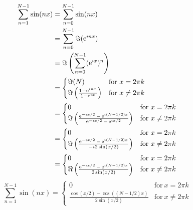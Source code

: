 {%
\begin{Solution}
  \label{solution sum sin nx}
  \begin{align*}
    \sum_{n=1}^{N-1} \sin(n x)
    &= \sum_{n=0}^{N-1} \sin(n x) 
    \\
    &= \sum_{n=0}^{N-1} \Im(\mathop{\mathrm{e}}\nolimits^{\imath n x}) 
    \\
    &= \Im \left( \sum_{n=0}^{N-1} (\mathop{\mathrm{e}}\nolimits^{\imath x})^n \right) 
    \\
    &= \begin{cases}
      \Im(N) &\mathrm{for}\ x = 2 \pi k 
      \\
      \Im \left( \frac{1 - \mathop{\mathrm{e}}\nolimits^{\imath n x}}{1-\mathop{\mathrm{e}}\nolimits^{\imath x}} \right) 
      &\mathrm{for}\ x \neq 2 \pi k
    \end{cases} 
    \\
    &= \begin{cases}
      0 &\mathrm{for}\ x = 2 \pi k 
      \\
      \Im \left( \frac{\mathop{\mathrm{e}}\nolimits^{-\imath x/2} - \mathop{\mathrm{e}}\nolimits^{\imath (N-1/2) x}}{\mathop{\mathrm{e}}\nolimits^{-\imath x/2} - \mathop{\mathrm{e}}\nolimits^{\imath x/2}} \right) 
      &\mathrm{for}\ x \neq 2 \pi k
    \end{cases} 
    \\
    &= \begin{cases}
      0 &\mathrm{for}\ x = 2 \pi k 
      \\
      \Im \left( \frac{\mathop{\mathrm{e}}\nolimits^{-\imath x/2} - \mathop{\mathrm{e}}\nolimits^{\imath (N-1/2) x}}{ - \imath 2 \sin(x/2) } \right) 
      &\mathrm{for}\ x \neq 2 \pi k
    \end{cases} 
    \\
    &= \begin{cases}
      0 &\mathrm{for}\ x = 2 \pi k 
      \\
      \Re \left( \frac{\mathop{\mathrm{e}}\nolimits^{-\imath x/2} - \mathop{\mathrm{e}}\nolimits^{\imath (N-1/2) x}}{ 2 \sin(x/2) } \right) 
      &\mathrm{for}\ x \neq 2 \pi k
    \end{cases}
  \end{align*}
  \[
  \boxed{
    \sum_{n=1}^{N-1} \sin(n x)
    = \begin{cases}
      0 &\mathrm{for}\ x = 2 \pi k 
      \\
      \frac{ \cos(x/2) - \cos((N-1/2) x)} { 2 \sin(x/2) } 
      &\mathrm{for}\ x \neq 2 \pi k
    \end{cases} 
    }
  \]
\end{Solution}


}

